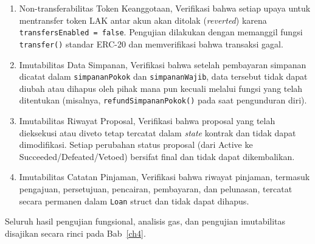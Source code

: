 \begin{enumerate}
	\item Non-transferabilitas Token Keanggotaan, Verifikasi bahwa setiap upaya untuk mentransfer token LAK antar akun akan ditolak (\textit{reverted}) karena \texttt{transfersEnabled = false}. Pengujian dilakukan dengan memanggil fungsi \texttt{transfer()} standar ERC-20 dan memverifikasi bahwa transaksi gagal.
	\item Imutabilitas Data Simpanan, Verifikasi bahwa setelah pembayaran simpanan dicatat dalam \texttt{simpananPokok} dan \texttt{simpananWajib}, data tersebut tidak dapat diubah atau dihapus oleh pihak mana pun kecuali melalui fungsi yang telah ditentukan (misalnya, \texttt{refundSimpananPokok()} pada saat pengunduran diri).
	\item Imutabilitas Riwayat Proposal, Verifikasi bahwa proposal yang telah dieksekusi atau diveto tetap tercatat dalam \textit{state} kontrak dan tidak dapat dimodifikasi. Setiap perubahan status proposal (dari Active ke Succeeded/Defeated/Vetoed) bersifat final dan tidak dapat dikembalikan.
	\item Imutabilitas Catatan Pinjaman, Verifikasi bahwa riwayat pinjaman, termasuk pengajuan, persetujuan, pencairan, pembayaran, dan pelunasan, tercatat secara permanen dalam \texttt{Loan} struct dan tidak dapat dihapus.
\end{enumerate}

Seluruh hasil pengujian fungsional, analisis gas, dan pengujian imutabilitas disajikan secara rinci pada Bab~\ref{ch4}.
